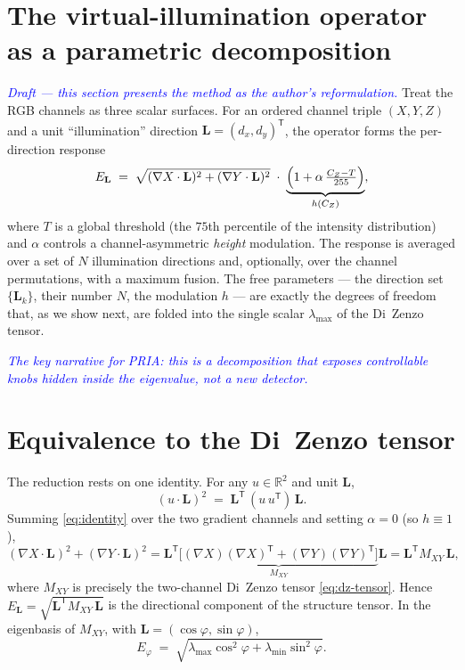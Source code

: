 \documentclass[11pt,a4paper]{article}
\newcommand{\note}[1]{\textcolor{blue}{\textit{#1}}}
\theoremstyle{plain}
\theoremstyle{definition}
\newcommand{\Lvec}{\mathbf{L}}
\newcommand{\grad}{\nabla}
\newcommand{\lmax}{\lambda_{\max}}
\newcommand{\lmin}{\lambda_{\min}}
\newcommand{\Mxy}{M_{XY}}
\newcommand{\transpose}{^{\mathsf T}}
\begin{document}
\section{The virtual-illumination operator as a parametric decomposition}
\label{sec:decomp}

\note{Draft --- this section presents the method as the author's reformulation.}
Treat the RGB channels as three scalar surfaces. For an ordered channel triple
$(X,Y,Z)$ and a unit ``illumination'' direction $\Lvec=(d_x,d_y)\transpose$,
the operator forms the per-direction response
\begin{equation}
\label{eq:vl-response}
E_{\Lvec}
\;=\;
\sqrt{(\grad X \cdot \Lvec)^2 + (\grad Y \cdot \Lvec)^2}
\;\cdot\;
\underbrace{\Bigl(1 + \alpha\,\tfrac{C_Z - T}{255}\Bigr)}_{h(C_Z)},
\end{equation}
where $T$ is a global threshold (the $75$th percentile of the intensity
distribution) and $\alpha$ controls a channel-asymmetric \emph{height}
modulation. The response is averaged over a set of $N$ illumination directions
and, optionally, over the channel permutations, with a maximum fusion. The
free parameters --- the direction set $\{\Lvec_k\}$, their number $N$, the
modulation $h$ --- are exactly the degrees of freedom that, as we show next,
are folded into the single scalar $\lmax$ of the Di~Zenzo tensor.

\note{The key narrative for PRIA: this is a \emph{decomposition} that exposes
controllable knobs hidden inside the eigenvalue, not a new detector.}

\section{Equivalence to the Di~Zenzo tensor}
\label{sec:equiv}

The reduction rests on one identity. For any $u\in\mathbb{R}^2$ and unit
$\Lvec$,
\begin{equation}
\label{eq:identity}
(u\cdot\Lvec)^2 \;=\; \Lvec\transpose\,(u\,u\transpose)\,\Lvec .
\end{equation}
Summing \eqref{eq:identity} over the two gradient channels and setting
$\alpha=0$ (so $h\equiv1$),
\begin{equation}
\label{eq:quadform}
(\grad X\cdot\Lvec)^2 + (\grad Y\cdot\Lvec)^2
=
\Lvec\transpose
\underbrace{\bigl[(\grad X)(\grad X)\transpose + (\grad Y)(\grad Y)\transpose\bigr]}_{\Mxy}
\Lvec
= \Lvec\transpose \Mxy\, \Lvec ,
\end{equation}
where $\Mxy$ is precisely the two-channel Di~Zenzo tensor
\eqref{eq:dz-tensor}. Hence $E_{\Lvec}=\sqrt{\Lvec\transpose \Mxy\,\Lvec}$ is the
directional component of the structure tensor. In the eigenbasis of $\Mxy$,
with $\Lvec=(\cos\varphi,\sin\varphi)$,
\begin{equation}
\label{eq:radial}
E_\varphi \;=\; \sqrt{\lmax\cos^2\varphi + \lmin\sin^2\varphi}.
\end{equation}
\end{document}
